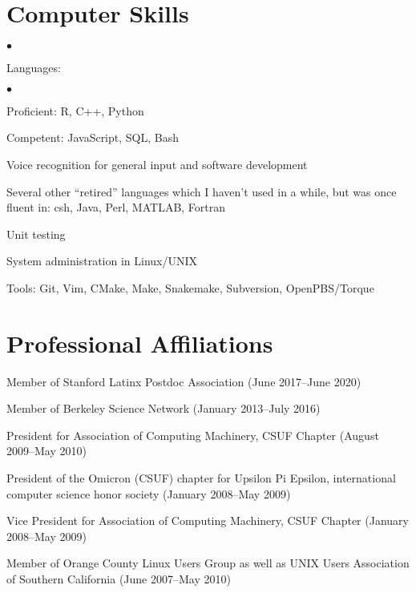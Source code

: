\documentclass[11pt,notitlepage]{article} %
\newenvironment{list2}{
  \vspace{-\parskip}
  \begin{list}{$\bullet$}{%
      \setlength{\itemsep}{0in}
      \setlength{\parsep}{0in} \setlength{\parskip}{0in}
      \setlength{\topsep}{0in} \setlength{\partopsep}{0in}
      \setlength{\leftmargin}{0.2in}}}{\end{list}}
\begin{document}
\section*{Computer Skills}
\begin{list2}
\item Languages:
  \begin{list2}
    \item Proficient: R, C++, Python
    \item Competent: JavaScript, SQL, Bash
  \end{list2}
\item Voice recognition for general input and software development
\item Several other ``retired'' languages which I haven't used in a while,
  but was once fluent in: csh, Java, Perl, MATLAB, Fortran
\item Unit testing
\item System administration in Linux/UNIX
\item Tools: Git, Vim, CMake, Make, Snakemake, Subversion, OpenPBS/Torque\\
\end{list2}

\bigskip
\section*{Professional Affiliations}
\medskip
Member of Stanford Latinx Postdoc Association
(June 2017--June 2020)

\medskip

Member of Berkeley Science Network
(January 2013--July 2016)

\medskip

President for Association of Computing Machinery, CSUF Chapter
(August 2009--May 2010)

\medskip

President of the Omicron (CSUF) chapter for Upsilon Pi Epsilon,
international computer science honor society (January 2008--May 2009)

\medskip

Vice President for Association of Computing Machinery, CSUF Chapter
(January 2008--May 2009)

\medskip

Member of Orange County Linux Users Group as well as UNIX Users
Association of Southern California (June 2007--May 2010)
\end{document}
